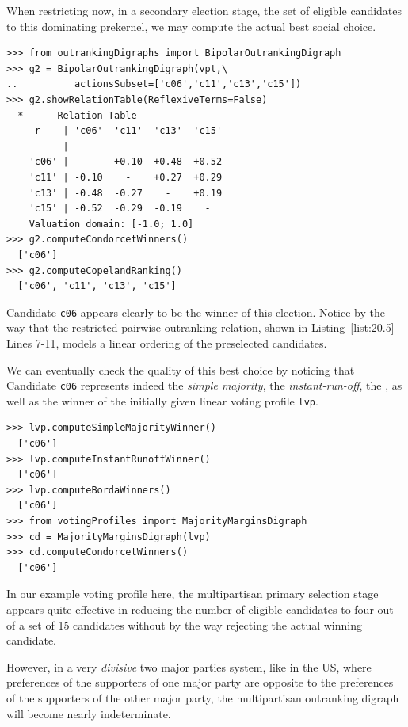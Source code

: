 
When restricting now, in a secondary election stage, the set of eligible candidates to this dominating prekernel, we may compute the actual best social choice.
\begin{lstlisting}[caption={Recommending the secondary election winner},label=list:20.5]
>>> from outrankingDigraphs import BipolarOutrankingDigraph
>>> g2 = BipolarOutrankingDigraph(vpt,\
..          actionsSubset=['c06','c11','c13','c15'])
>>> g2.showRelationTable(ReflexiveTerms=False)
  * ---- Relation Table -----
     r    | 'c06'  'c11'  'c13'  'c15'   
    ------|----------------------------
    'c06' |   -    +0.10  +0.48  +0.52  
    'c11' | -0.10    -    +0.27  +0.29  
    'c13' | -0.48  -0.27    -    +0.19  
    'c15' | -0.52  -0.29  -0.19    -   
    Valuation domain: [-1.0; 1.0]
>>> g2.computeCondorcetWinners()
  ['c06']
>>> g2.computeCopelandRanking()
  ['c06', 'c11', 'c13', 'c15']
\end{lstlisting}

Candidate \texttt{c06} appears clearly to be the winner of this election. Notice by the way that the restricted pairwise outranking relation, shown in Listing~\ref{list:20.5} Lines 7-11, models a linear ordering of the preselected candidates.

We can eventually check the quality of this best choice by noticing that Candidate \texttt{c06} represents indeed the \emph{simple majority}, the \emph{instant-run-off}, the \Borda, as well as the \Condorcet winner of the initially given linear voting profile \texttt{lvp}.
\begin{lstlisting}
>>> lvp.computeSimpleMajorityWinner()
  ['c06']
>>> lvp.computeInstantRunoffWinner()
  ['c06']
>>> lvp.computeBordaWinners()
  ['c06']
>>> from votingProfiles import MajorityMarginsDigraph
>>> cd = MajorityMarginsDigraph(lvp)
>>> cd.computeCondorcetWinners()
  ['c06']
\end{lstlisting}

In our example voting profile here, the multipartisan primary selection stage appears quite effective in reducing the number of eligible candidates to four out of a set of 15 candidates without by the way rejecting the actual winning candidate.

However, in a very \emph{divisive} two major parties system, like in the US, where preferences of the supporters of one major party are opposite to the preferences of the supporters of the other major party, the multipartisan outranking digraph will become nearly indeterminate.

